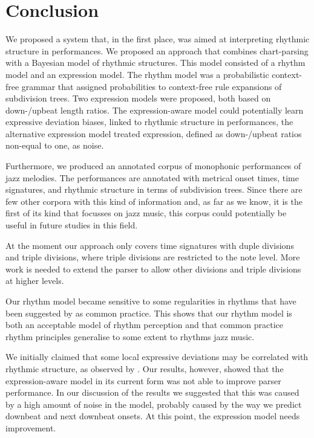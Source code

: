 \chapter{Conclusion}
\label{sec:conclusion}


We proposed a system that, in the first place, was aimed at interpreting rhythmic structure in performances. We proposed an approach that combines chart-parsing with a Bayesian model of rhythmic structures. This model consisted of a rhythm model and an expression model. The rhythm model was a probabilistic context-free grammar that assigned probabilities to context-free rule expansions of subdivision trees. Two expression models were proposed, both based on down-/upbeat length ratios. The expression-aware model could potentially learn expressive deviation biases, linked to rhythmic structure in performances, the alternative expression model treated expression, defined as down-/upbeat ratios non-equal to one, as noise.

Furthermore, we produced an annotated corpus of monophonic performances of jazz melodies. The performances are annotated with metrical onset times, time signatures, and rhythmic structure in terms of subdivision trees. Since there are few other corpora with this kind of information and, as far as we know, it is the first of its kind that focusses on jazz music, this corpus could potentially be useful in future studies in this field. 

At the moment our approach only covers time signatures with duple divisions and triple divisions, where triple divisions are restricted to the note level. More work is needed to extend the parser to allow other divisions and triple divisions at higher levels.

Our rhythm model became sensitive to some regularities in rhythms that have been suggested by \citet{temperley2010modeling} as common practice. This shows that our rhythm model is both an acceptable model of rhythm perception and that common practice rhythm principles generalise to some extent to rhythms jazz music.

We initially claimed that some local expressive deviations may be correlated with rhythmic structure, as observed by \citet{bengtsson1983analysis}. Our results, however, showed that the expression-aware model in its current form was not able to improve parser performance. In our discussion of the results we suggested that this was caused by a high amount of noise in the model, probably caused by the way we predict downbeat and next downbeat onsets. At this point, the expression model needs improvement.

